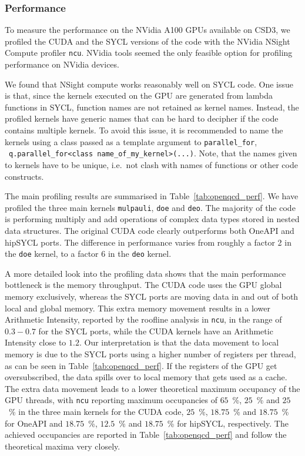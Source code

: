 \documentclass[../main]{subfiles}
\begin{document}
\subsubsection{Performance}\label{sec:openqcd_performance}

To measure the performance on the NVidia A100 GPUs available on CSD3, we profiled the CUDA and the SYCL versions of the code with the NVidia NSight Compute profiler \texttt{ncu}.
NVidia tools seemed the only feasible option for profiling performance on NVidia devices.

We found that NSight compute works reasonably well on SYCL code.
One issue is that, since the kernels executed on the GPU are generated from lambda functions in SYCL, function names are not retained as kernel names.
Instead, the profiled kernels have generic names that can be hard to decipher if the code contains multiple kernels.
To avoid this issue, it is recommended to name the kernels using a class passed as a template argument to \verb #parallel_for#, \eg~\lstinline{q.parallel_for<class name_of_my_kernel>(...)}.
Note, that the names given to kernels have to be unique, i.e.\ not clash with names of functions or other code constructs.

The main profiling results are summarised in Table~\ref{tab:openqcd_perf}.
We have profiled the three main kernels \texttt{mulpauli}, \texttt{doe} and \texttt{deo}.
The majority of the code is performing multiply and add operations of complex data types stored in nested data structures.
The original CUDA code clearly outperforms both OneAPI and hipSYCL ports.
The difference in performance varies from roughly a factor 2 in the \texttt{doe} kernel, to a factor 6 in the \texttt{deo} kernel.

A more detailed look into the profiling data shows that the main performance bottleneck is the memory throughput.
The CUDA code uses the GPU global memory exclusively, whereas the SYCL ports are moving data in and out of both local and global memory.
This extra memory movement results in a lower Arithmetic Intensity, reported by the roofline analysis in \texttt{ncu}, in the range of $0.3 - 0.7$ for the SYCL ports, while the CUDA kernels have an Arithmetic Intensity close to $1.2$.
Our interpretation is that the data movement to local memory is due to the SYCL ports using a higher number of registers per thread, as can be seen in Table~\ref{tab:openqcd_perf}.
If the registers of the GPU get oversubscribed, the data spills over to local memory that gets used as a cache.
The extra data movement leads to a lower theoretical maximum occupancy of the GPU threads, with \texttt{ncu} reporting maximum occupancies of $65$~\%, $25$~\% and $25$~\% in the three main kernels for the CUDA code, $25$~\%, $18.75$~\% and $18.75$~\% for OneAPI and $18.75$~\%, $12.5$~\% and $18.75$~\% for hipSYCL, respectively.
The achieved occupancies are reported in Table~\ref{tab:openqcd_perf} and follow the theoretical maxima very closely.
\end{document}
